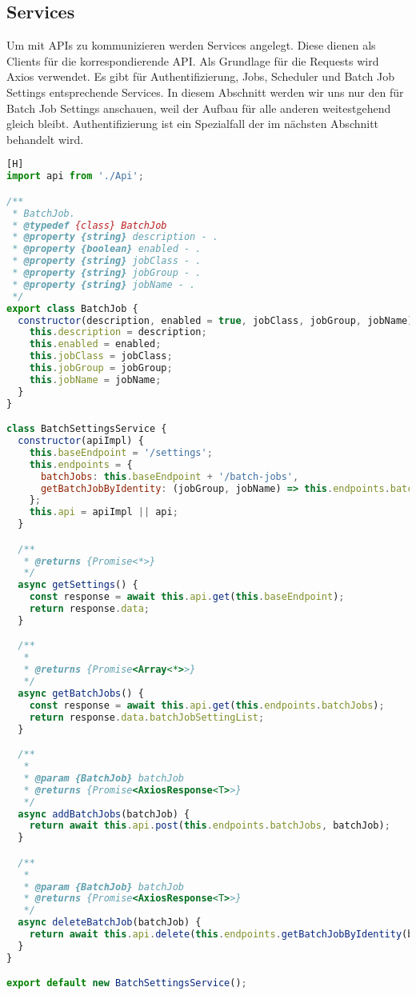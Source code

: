 \subsection{Services}
Um mit APIs zu kommunizieren werden Services angelegt. Diese dienen als Clients für die korrespondierende API. Als Grundlage für die Requests wird Axios verwendet. Es gibt für Authentifizierung, Jobs, Scheduler und Batch Job Settings entsprechende Services. In diesem Abschnitt werden wir uns nur den für Batch Job Settings anschauen, weil der Aufbau für alle anderen weitestgehend gleich bleibt. Authentifizierung ist ein Spezialfall der im nächsten Abschnitt behandelt wird.

\begin{lstlisting}[language=JavaScript,caption=src/services/BatchSettingsService.js][H]
import api from './Api';

/**
 * BatchJob.
 * @typedef {class} BatchJob
 * @property {string} description - .
 * @property {boolean} enabled - .
 * @property {string} jobClass - .
 * @property {string} jobGroup - .
 * @property {string} jobName - .
 */
export class BatchJob {
  constructor(description, enabled = true, jobClass, jobGroup, jobName) {
    this.description = description;
    this.enabled = enabled;
    this.jobClass = jobClass;
    this.jobGroup = jobGroup;
    this.jobName = jobName;
  }
}

class BatchSettingsService {
  constructor(apiImpl) {
    this.baseEndpoint = '/settings';
    this.endpoints = {
      batchJobs: this.baseEndpoint + '/batch-jobs',
      getBatchJobByIdentity: (jobGroup, jobName) => this.endpoints.batchJobs + `/jobgroup/${jobGroup}/jobname/${jobName}`
    };
    this.api = apiImpl || api;
  }

  /**
   * @returns {Promise<*>}
   */
  async getSettings() {
    const response = await this.api.get(this.baseEndpoint);
    return response.data;
  }

  /**
   *
   * @returns {Promise<Array<*>>}
   */
  async getBatchJobs() {
    const response = await this.api.get(this.endpoints.batchJobs);
    return response.data.batchJobSettingList;
  }

  /**
   *
   * @param {BatchJob} batchJob
   * @returns {Promise<AxiosResponse<T>>}
   */
  async addBatchJobs(batchJob) {
    return await this.api.post(this.endpoints.batchJobs, batchJob);
  }

  /**
   *
   * @param {BatchJob} batchJob
   * @returns {Promise<AxiosResponse<T>>}
   */
  async deleteBatchJob(batchJob) {
    return await this.api.delete(this.endpoints.getBatchJobByIdentity(batchJob.jobGroup, batchJob.jobName));
  }
}

export default new BatchSettingsService();
\end{lstlisting}

